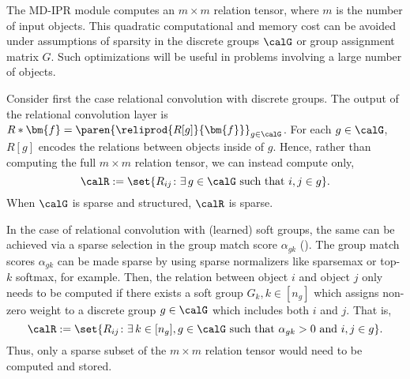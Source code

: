 The MD-IPR module computes an $m \times m$ relation tensor, where $m$ is the number of input objects. This quadratic computational and memory cost can be avoided under assumptions of sparsity in the discrete groups $\calG$ or group assignment matrix $G$. Such optimizations will be useful in problems involving a large number of objects.

Consider first the case relational convolution with discrete groups. The output of the relational convolution layer is $R \ast \bm{f} = \paren{\reliprod{R[g]}{\bm{f}}}_{g \in \calG}$. For each $g \in \calG$, $R[g]$ encodes the relations between objects inside of $g$. Hence, rather than computing the full $m \times m$ relation tensor, we can instead compute only,
\begin{equation*}
    \calR := \set{R_{ij} \colon \exists\, g \in \calG \text{ such that } i,j \in g}.
\end{equation*}
When $\calG$ is sparse and structured, $\calR$ is sparse.

In the case of relational convolution with (learned) soft groups, the same can be achieved via a sparse selection in the group match score $\alpha_{gk}$ (). The group match scores $\alpha_{gk}$ can be made sparse by using sparse normalizers like sparsemax or top-$k$ softmax, for example. Then, the relation between object $i$ and object $j$ only needs to be computed if there exists a soft group $G_k, k \in [n_g]$ which assigns non-zero weight to a discrete group $g \in \calG$ which includes both $i$ and $j$. That is,
\begin{equation*}
    \calR := \set{R_{ij} \colon \exists\, k \in [n_g], g \in \calG \text{ such that } \alpha_{gk} > 0 \text{ and } i,j \in g}.
\end{equation*}
Thus, only a sparse subset of the $m \times m$ relation tensor would need to be computed and stored.
